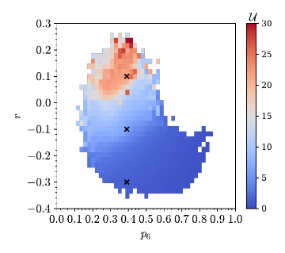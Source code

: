 \begin{figure}[bt]
     \centering
      \begin{subfigure}[b]{0.45\textwidth}
         \centering
         \includegraphics[width=\textwidth]{./figures/general_networks/energy_full92.pdf}
         \caption{}
         \label{fig:fullerene92u}
     \end{subfigure}
     \hfill
     
	\vspace{0.2cm}     
     

\end{figure}
